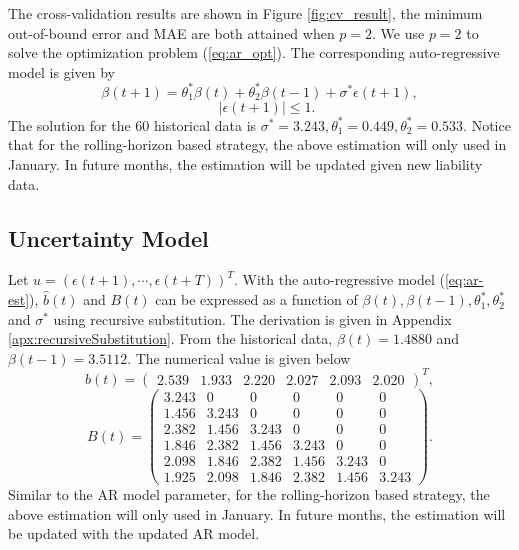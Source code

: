 \begin{enumerate}[A)]
    The cross-validation results are shown in Figure \ref{fig:cv_result}, the minimum  out-of-bound error and MAE are both attained when $p=2$. We use $p=2$ to solve the optimization problem (\ref{eq:ar_opt}). The corresponding auto-regressive model is given by
    \begin{equation}\label{eq:ar-est}
        \beta(t+1) = \theta_1^*\beta(t) + \theta_2^*\beta(t-1)+\sigma^*\epsilon(t+1),
    \end{equation}
    \[\quad|\epsilon(t+1)|\leq 1.\]
    The solution for the 60 historical data is
    $\sigma^* = 3.243, \theta^*_1 = 0.449, \theta^*_2 = 0.533.$
    Notice that for the rolling-horizon based strategy, the above estimation will only used in January. In future months, the estimation will be updated given new liability data.

\end{enumerate}

\subsection{Uncertainty Model}

    Let $u = (\epsilon(t+1), \cdots, \epsilon(t+T))^T$. With the auto-regressive model (\ref{eq:ar-est}), $\hat{b}(t)$ and $B(t)$ can be expressed as a function of $\beta(t), \beta(t-1), \theta_1^*, \theta_2^*$ and $\sigma^*$ using recursive substitution. The derivation is given in Appendix \ref{apx:recursiveSubstitution}. From the historical data, $\beta(t) = 1.4880$ and $\beta(t-1)=3.5112$. The numerical value is given below
    \[
	   \hat{b}(t) = 
        \begin{pmatrix}
    	2.539 & 1.933 & 2.220 & 2.027 & 2.093 & 2.020
	   \end{pmatrix}^T,
    \]
    \[
	   B(t) = 
        \begin{pmatrix}
    	   3.243 & 0 & 0 & 0 & 0 & 0 \\
            1.456 & 3.243 & 0 & 0 & 0 & 0 \\
            2.382 & 1.456 & 3.243 & 0 & 0 & 0 \\
            1.846 & 2.382 & 1.456 & 3.243 & 0 & 0 \\
            2.098 & 1.846 & 2.382 & 1.456 & 3.243 & 0 \\
            1.925 & 2.098 & 1.846 & 2.382 & 1.456 & 3.243
        \end{pmatrix}.
    \]
    Similar to the AR model parameter, for the rolling-horizon based strategy, the above estimation will only used in January. In future months, the estimation will be updated with the updated AR model.
